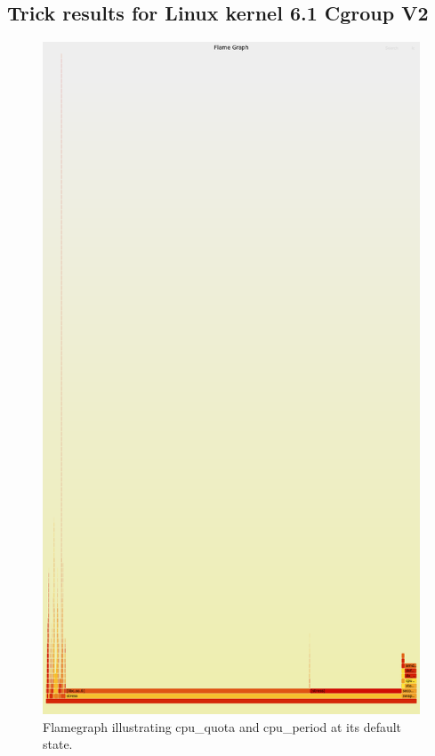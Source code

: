 \documentclass{report}  %
\begin{document}
\subsection{Trick results for Linux kernel 6.1 Cgroup V2}

\begin{figure}[H]
    \centering
    \includegraphics[scale=0.2]{cpu_tricks/6.1.0/V2/flamegraph_20241021_101227.png}
    \caption{Flamegraph illustrating cpu\_quota and cpu\_period at its default state.}
    \label{fig:flamegraph}
\end{figure}
\end{document}
